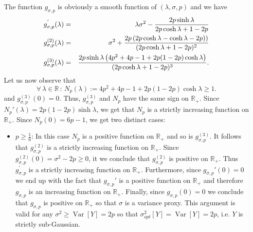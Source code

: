 \documentclass[a4paper, 10pt]{article}
\newcommand{\beq}{\begin{equation}}
\newcommand{\eeq}{\end{equation}}
\newcommand{\bea}{\begin{eqnarray}}
\newcommand{\eea}{\end{eqnarray}}
\theoremstyle{definition}
\begin{document}
The function $g_{\sigma,p}$ is obviously a smooth function of $(\lambda,\sigma,p)$ and we have
\bea g^{'}_{\sigma,p}(\lambda)&=&\lambda \sigma^2 -\frac{2p\sinh \lambda }{2p\cosh \lambda +1-2p}\cr 
g^{(2)}_{\sigma,p}(\lambda)&=&\sigma^2+\frac{2p\left(2p\cosh \lambda -\cosh \lambda -2p)\right)}{(2p\cosh \lambda +1-2p)^2}\cr
g^{(3)}_{\sigma,p}(\lambda)&=&\frac{2p\sinh \lambda\left(4p^2+4p-1+2p(1-2p)\cosh \lambda\right) }{(2p\cosh \lambda +1-2p)^3}.
\eea
Let us now observe that 
\beq \forall \, \lambda\in \mathbb{R} \,:\,N_{p}(\lambda):=4p^2+4p-1+2p(1-2p)\cosh \lambda \geq 1.\eeq
and $g^{(3)}_{\sigma,p}(0)=0$. Thus, $g^{(3)}_{\sigma,p}$ and $N_{p}$ have the same sign on $\mathbb{R}_+$. Since $N_{p}'(\lambda)=2p(1-2p)\sinh \lambda$, we get that $N_{p}$ is a strictly increasing function on $\mathbb{R}_+$. Since $N_{p}(0)=6p-1$, we get two distinct cases:
\begin{itemize}
    \item $p\geq \frac{1}{6}$: In this case $N_{p}$ is a positive function on $\mathbb{R}_+$ and so is $g^{(3)}_{\sigma,p}$. It follows that $g_{\sigma,p}^{(2)}$ is a strictly increasing function on $\mathbb{R}_+$. Since $g^{(2)}_{\sigma,p}(0)=\sigma^2-2p\geq0$, it we conclude that $g^{(2)}_{\sigma,p}$ is positive  on $\mathbb{R}_+$. Thus $g^{'}_{\sigma,p}$ is a strictly increasing function on $\mathbb{R}_+$. Furthermore, since $g_{\sigma,p}'(0)=0$ we end up with the fact that $g_{\sigma,p}'$ is a positive function on $\mathbb{R}_+$ and therefore $g_{\sigma,p}$ is an increasing function on $\mathbb{R}_+$. Finally, since $g_{\sigma,p}(0)=0$ we conclude that $g_{\sigma,p}$ is positive on $\mathbb{R}_+$ so that $\sigma$ is a variance proxy. This argument is valid for any $\sigma^2\geq \operatorname{Var}[Y]=2p$ so that $\sigma^2_{opt}[Y]=\operatorname{Var}[Y]=2p$, i.e. {$Y$ is strictly sub-Gaussian}.

\end{itemize}
\end{document}
